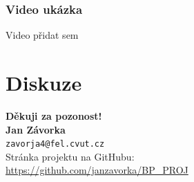 \documentclass{beamer}
\makeatletter
\newcommand\FirstName{Jan}
\newcommand\LastName{Závorka}
\newcommand\Email{zavorja4@fel.cvut.cz}
\makeatother
\begin{document}
\begin{frame}
\frametitle{Video ukázka}
Video přidat sem
\end{frame}


\section{Diskuze}
\begin{frame}
\begin{center}
\vspace*{1cm}
{\bf Děkuji za pozonost!}\\
\vspace*{1.2cm}
{\bf\Large \FirstName{} \LastName{}}\\
{\tt \Email} \\[1em]
Stránka projektu na GitHubu: \\
\url{https://github.com/janzavorka/BP_PROJ}
\vspace*{1cm}
\end{center}
\end{frame}

\appendix
\end{document}

